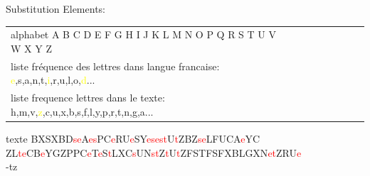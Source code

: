 \documentclass[10pt,xcolor=table]{beamer}
\begin{document}
\begin{frame}
\begin{exampleblock}{Substitution}
Elements:
\begin{tabular}{l!{\vrule}ccccccc} 
alphabet A B C D E F G H I J K L M N O P Q R S T U V W X Y Z \\   
liste fréquence des lettres dans langue francaise: \textcolor{yellow}{e},s,a,n,t,\textcolor{yellow}{i},r,u,l,o,\textcolor{yellow}{d}... \\ 
liste frequence lettres dans le texte: h,m,v,\textcolor{yellow}{z},c,u,x,b,s,f,l,y,p,r,t,n,g,a...
\end{tabular}
\end{exampleblock}
\begin{exampleblock}{texte}
BXSXBD\textcolor{red}{s}\textcolor{red}{e}A\textcolor{red}{e}\textcolor{red}{s}PC\textcolor{red}{e}RU\textcolor{red}{e}SY\textcolor{red}{e}\textcolor{red}{s}\textcolor{red}{e}\textcolor{red}{s}\textcolor{red}{t}U\textcolor{red}{t}ZBZ\textcolor{red}{s}\textcolor{red}{e}LFUCA\textcolor{red}{e}YC
ZL\textcolor{red}{t}\textcolor{red}{e}CB\textcolor{red}{e}YGZPPC\textcolor{red}{e}T\textcolor{red}{e}S\textcolor{red}{t}LXC\textcolor{red}{s}UN\textcolor{red}{s}\textcolor{red}{t}Z\textcolor{red}{t}U\textcolor{red}{t}ZFSTFSFXBLGXN\textcolor{red}{e}\textcolor{red}{t}ZRU\textcolor{red}{e} \\ \vspace{2\baselineskip}
-tz
\end{exampleblock}
\end{frame}
\end{document}
